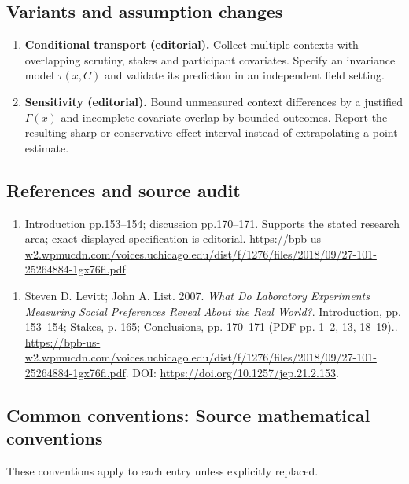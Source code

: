\documentclass[11pt,a4paper]{article}
\begin{document}
\subsection*{Variants and assumption changes}
\begin{enumerate}
\item \textbf{Conditional transport (editorial).} Collect multiple contexts with overlapping scrutiny, stakes and participant covariates. Specify an invariance model \(\tau(x,C)\) and validate its prediction in an independent field setting.
\item \textbf{Sensitivity (editorial).} Bound unmeasured context differences by a justified \(\Gamma(x)\) and incomplete covariate overlap by bounded outcomes. Report the resulting sharp or conservative effect interval instead of extrapolating a point estimate.
\end{enumerate}
\subsection*{References and source audit}
\begin{enumerate}
\item Introduction pp.153–154; discussion pp.170–171. Supports the stated research area; exact displayed specification is editorial. \url{https://bpb-us-w2.wpmucdn.com/voices.uchicago.edu/dist/f/1276/files/2018/09/27-101-25264884-1gx76fi.pdf}
\end{enumerate}
\begin{enumerate}\raggedright
\item\hypertarget{definitions:source:30007588:1}{} Steven D. Levitt; John A. List. 2007. \emph{What Do Laboratory Experiments Measuring Social Preferences Reveal About the Real World?}. Introduction, pp. 153–154; Stakes, p. 165; Conclusions, pp. 170–171 (PDF pp. 1–2, 13, 18–19)..
\url{https://bpb-us-w2.wpmucdn.com/voices.uchicago.edu/dist/f/1276/files/2018/09/27-101-25264884-1gx76fi.pdf}.
DOI: \url{https://doi.org/10.1257/jep.21.2.153}.
\end{enumerate}

\subsection*{Common conventions: Source mathematical conventions}

These conventions apply to each entry unless explicitly replaced.
\end{document}
